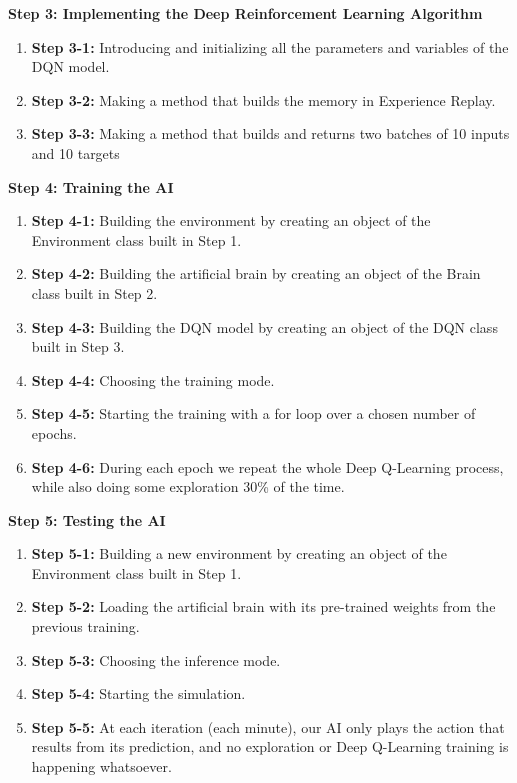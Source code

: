 \documentclass[]{book}
\begin{document}
\textbf{Step 3: Implementing the Deep Reinforcement Learning Algorithm}

\begin{enumerate}
    \item \textbf{Step 3-1:} Introducing and initializing all the parameters and variables of the DQN model.
    \item \textbf{Step 3-2:} Making a method that builds the memory in Experience Replay.
    \item \textbf{Step 3-3:} Making a method that builds and returns two batches of 10 inputs and 10 targets
\end{enumerate}

\textbf{Step 4: Training the AI}

\begin{enumerate}
    \item \textbf{Step 4-1:} Building the environment by creating an object of the Environment class built in Step 1.
    \item \textbf{Step 4-2:} Building the artificial brain by creating an object of the Brain class built in Step 2.
    \item \textbf{Step 4-3:} Building the DQN model by creating an object of the DQN class built in Step 3.
    \item \textbf{Step 4-4:} Choosing the training mode.
    \item \textbf{Step 4-5:} Starting the training with a for loop over a chosen number of epochs.
    \item \textbf{Step 4-6:} During each epoch we repeat the whole Deep Q-Learning process, while also doing some exploration 30\% of the time.
\end{enumerate}

\textbf{Step 5: Testing the AI}

\begin{enumerate}
    \item \textbf{Step 5-1:} Building a new environment by creating an object of the Environment class built in Step 1.
    \item \textbf{Step 5-2:} Loading the artificial brain with its pre-trained weights from the previous training.
    \item \textbf{Step 5-3:} Choosing the inference mode.
    \item \textbf{Step 5-4:} Starting the simulation.
    \item \textbf{Step 5-5:} At each iteration (each minute), our AI only plays the action that results from its prediction, and no exploration or Deep Q-Learning training is happening whatsoever.
\end{enumerate}
\end{document}
